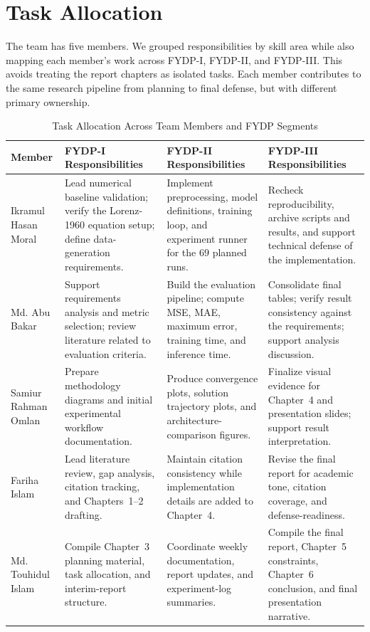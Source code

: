 \section{Task Allocation}

The team has five members. We grouped responsibilities by skill area while also mapping each member's work across FYDP-I, FYDP-II, and FYDP-III. This avoids treating the report chapters as isolated tasks. Each member contributes to the same research pipeline from planning to final defense, but with different primary ownership.

\begin{table}[H]
\centering
\caption{Task Allocation Across Team Members and FYDP Segments}
\label{tab:tasks}
\scriptsize
\renewcommand{\arraystretch}{1.2}
\begin{tabularx}{\textwidth}{|p{2.4cm}|>{\raggedright\arraybackslash}X|>{\raggedright\arraybackslash}X|>{\raggedright\arraybackslash}X|}
\hline
\textbf{Member} & \textbf{FYDP-I Responsibilities} & \textbf{FYDP-II Responsibilities} & \textbf{FYDP-III Responsibilities} \\
\hline
Ikramul Hasan Moral & Lead numerical baseline validation; verify the Lorenz-1960 equation setup; define data-generation requirements. & Implement preprocessing, model definitions, training loop, and experiment runner for the $69$ planned runs. & Recheck reproducibility, archive scripts and results, and support technical defense of the implementation. \\
\hline
Md. Abu Bakar & Support requirements analysis and metric selection; review literature related to evaluation criteria. & Build the evaluation pipeline; compute MSE, MAE, maximum error, training time, and inference time. & Consolidate final tables; verify result consistency against the requirements; support analysis discussion. \\
\hline
Samiur Rahman Omlan & Prepare methodology diagrams and initial experimental workflow documentation. & Produce convergence plots, solution trajectory plots, and architecture-comparison figures. & Finalize visual evidence for Chapter~4 and presentation slides; support result interpretation. \\
\hline
Fariha Islam & Lead literature review, gap analysis, citation tracking, and Chapters~1--2 drafting. & Maintain citation consistency while implementation details are added to Chapter~4. & Revise the final report for academic tone, citation coverage, and defense-readiness. \\
\hline
Md. Touhidul Islam & Compile Chapter~3 planning material, task allocation, and interim-report structure. & Coordinate weekly documentation, report updates, and experiment-log summaries. & Compile the final report, Chapter~5 constraints, Chapter~6 conclusion, and final presentation narrative. \\
\hline
\end{tabularx}
\end{table}

